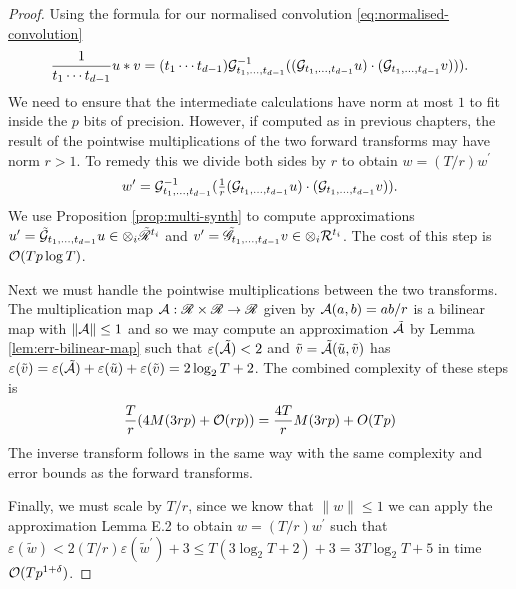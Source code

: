 \begin{proof}
    Using the formula for our normalised convolution \eqref{eq:normalised-convolution}
    \[
        \frac{1}{t_1 \cdots t_{d-1}}u \ast v = (t_1 \cdots t_{d-1})\mathcal G^{-1}_{t_1, \ldots, t_{d-1}}((\mathcal G_{t_1, \ldots, t_{d-1}}u)\cdot (\mathcal G_{t_1, \ldots, t_{d-1}} v))).
    \]
    We need to ensure that the intermediate calculations have norm at most $1$ to fit inside the $p$ bits of precision. However, if computed as in previous chapters, the result of the pointwise multiplications of the two forward transforms may have norm $r > 1$. To remedy this we divide both sides by $r$ to obtain $w = (T/r)w^\prime$
    \begin{equation}\label{eq:idk}
        w^\prime = \mathcal G^{-1}_{t_1, \ldots, t_{d-1}}(\tfrac{1}{r}(\mathcal G_{t_1, \ldots, t_{d-1}}u) \cdot (\mathcal G_{t_1, \ldots, t_{d-1}}v)).
    \end{equation}
    We use Proposition \ref{prop:multi-synth} to compute approximations $u^\prime = \tilde{\mathcal G}_{t_1, \ldots, t_{d-1}} u \in \otimes_i \tilde{\mathscr{R}}^{t_i}$ and $v^\prime = \tilde{\mathscr{G}}_{t_1, \ldots, t_{d-1}} v \in \otimes_i \mathcal R^{t_i}$. The cost of this step is $\mathcal O(Tp \log T)$.

    Next we must handle the pointwise multiplications between the two transforms. The multiplication map $\mathcal A: \mathscr{R} \times \mathscr{R} \to \mathscr{R}$ given by $\mathcal A(a, b) = ab/r$ is a bilinear map with $\|\mathcal A\| \le 1$ and so we may compute an approximation $\tilde{\mathcal A}$ by Lemma \ref{lem:err-bilinear-map} such that $\varepsilon(\tilde{\mathcal A}) < 2$ and $\tilde{v} = \tilde{\mathcal A}(\tilde{u}, \tilde{v})$ has $\varepsilon(\tilde{v}) = \varepsilon(\tilde{\mathcal A}) + \varepsilon(\tilde{u}) + \varepsilon(\tilde{v}) = 2\log_2 T + 2$. The combined complexity of these steps is
    \[
        \frac{T}{r}(4M(3rp) + \mathcal O(rp)) = \frac{4T}{r} M(3rp) + O(Tp)
    \]
    The inverse transform follows in the same way with the same complexity and error bounds as the forward transforms.

    Finally, we must scale by $T/r$, since we know that $\|w\| \le 1$ we can apply the approximation Lemma E.2 to obtain $w = (T/r)w^\prime$ such that $\varepsilon(\tilde{w}) < 2(T/r)\varepsilon(\tilde{w}^\prime) + 3 \le T(3 \log_2 T + 2) + 3 = 3T\log_2 T + 5$ in time $\mathcal O(Tp^{1 + \delta})$.
\end{proof}


